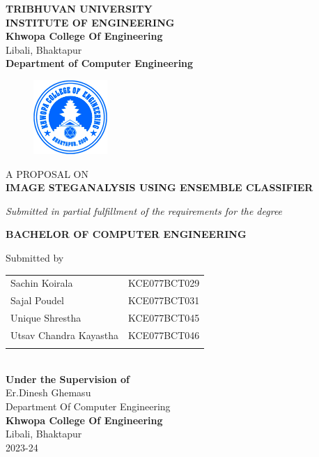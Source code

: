 	\begin{center}
		\thispagestyle{empty}
		\Large\textbf{TRIBHUVAN UNIVERSITY}\\
		\Large\textbf{INSTITUTE OF ENGINEERING }\\
		\vspace{0.2in}
		\large{\textbf{Khwopa College Of Engineering}\\}
		\normalsize{Libali, Bhaktapur\\}
		\large\textbf{Department of Computer Engineering}
		\vspace{0.2in}
		\begin{figure}[h]
		    \centering
			    \includegraphics[width=0.25\textwidth]{img/Khwopalogo.jpg}
		\end{figure}
		
		\vspace{0.2in}
		\large{A PROPOSAL ON\\\textbf{IMAGE STEGANALYSIS USING ENSEMBLE CLASSIFIER}\\}
		
		\vspace{0.2in}
		\large{\textit{Submitted in partial fulfillment of the requirements for the degree\\}}
		
		\vspace{0.2in}
		\large{\textbf{BACHELOR OF COMPUTER ENGINEERING}\\}
		
		\vspace{0.2in}
		\large{Submitted by}\\
		\begin{tabular}{p{3.5in}p{3in}}
			\hspace{0.3cm}Sachin Koirala & KCE077BCT029\\
			\hspace{0.3cm}Sajal Poudel & KCE077BCT031\\
			\hspace{0.3cm}Unique Shrestha & KCE077BCT045\\
			\hspace{0.3cm}Utsav Chandra Kayastha &KCE077BCT046\\
		 \vspace{0.2in}
		\end{tabular}
		\\
		\vspace{1cm}
		\large{\textbf{Under the Supervision of}\\}
			\normalsize{Er.Dinesh Ghemasu\\
				Department Of Computer Engineering\\
			}
			\vspace{2cm}
		\large{\textbf{Khwopa College Of Engineering}\\}
			\normalsize{Libali, Bhaktapur\\
			2023-24
		}
	\end{center}

